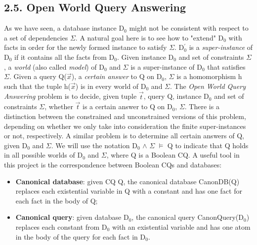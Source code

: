 \documentclass[11pt, a4paper, dvipsnames]{article}
\begin{document}
\subsection{2.5. Open World Query Answering}
As we have seen, a database instance D$_{0}$ might not be consistent with respect to a set of dependencies $\Sigma$. A natural goal here is to see how to "extend" D$_{0}$ with facts in order for the newly formed instance to satisfy $\Sigma$.\newline
D$^{'}_{0}$ is a \textit{super-instance} of D$_{0}$ if it contains all the facts from D$_{0}$.  Given instance D$_{0}$ and set of constraints $\Sigma$, a \textit{world} (also called \textit{model}) of D$_{0}$ and $\Sigma$ is a super-instance of D$_{0}$ that satisfies $\Sigma$. Given a query Q($\vec{x}$), a \textit{certain answer} to Q on D$_{0}$, $\Sigma$ is a homomorphism h such that the tuple h($\vec{x}$) is in every world of D$_{0}$ and $\Sigma$. \newline
The \textit{Open World Query Answering} problem is to decide, given tuple $\vec{t}$, query Q, instance D$_{0}$ and set of constraints $\Sigma$, whether $\vec{t}$ is a certain answer to Q on D$_{0}$, $\Sigma$. There is a distinction between the constrained and unconstrained versions of this problem, depending on whether we only take into consideration the finite super-instances or not, respectively. A similar problem is to determine all certain answers of Q, given D$_{0}$ and $\Sigma$.\newline
We will use the notation D$_{0}$ $\wedge$ $\Sigma$ $\vDash$ Q to indicate that Q holds in all possible worlds of D$_{0}$ and $\Sigma$, where Q is a Boolean CQ.\newline
A useful tool in this project is the correspondence between Boolean CQs and databases:
\begin{itemize}
	\item \textbf{Canonical database}: given CQ Q, the canonical database CanonDB(Q) replaces each existential variable in Q with a constant and has one fact for each fact in the body of Q;
	\item \textbf{Canonical query}: given database D$_{0}$, the canonical query CanonQuery(D$_{0}$) replaces each constant from D$_{0}$ with an existential variable and has one atom in the body of the query for each fact in D$_{0}$.
\end{itemize}
\end{document}
